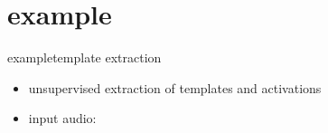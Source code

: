     \section[example]{example}
        
        \begin{frame}{example}{template extraction}
        
            \begin{itemize}
                \item   unsupervised extraction of templates and activations
                \item   input audio: 
            \end{itemize}
            \vspace{-3mm}
        \end{frame}
                
